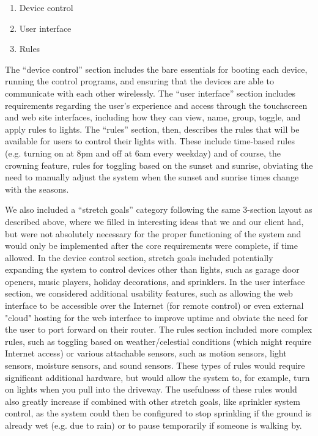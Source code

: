 \documentclass[letterpaper,10pt]{article}
\begin{document}
\begin{enumerate}
    \item Device control
    \item User interface
    \item Rules
\end{enumerate}

The ``device control'' section includes the bare essentials for booting each
device, running the control programs, and ensuring that the devices are able to
communicate with each other wirelessly.  The ``user interface'' section
includes requirements regarding the user's experience and access through the
touchscreen and web site interfaces, including how they can view, name, group,
toggle, and apply rules to lights.  The ``rules'' section, then, describes the
rules that will be available for users to control their lights with.  These
include time-based rules (e.g. turning on at 8pm and off at 6am every weekday)
and of course, the crowning feature, rules for toggling based on the sunset and
sunrise, obviating the need to manually adjust the system when the sunset and
sunrise times change with the seasons.

We also included a ``stretch goals'' category following the same 3-section
layout as described above, where we filled in interesting ideas that we and our
client had, but were not absolutely necessary for the proper functioning of the
system and would only be implemented after the core requirements were complete,
if time allowed.  In the device control section, stretch goals included
potentially expanding the system to control devices other than lights, such as
garage door openers, music players, holiday decorations, and sprinklers.  In
the user interface section, we considered additional usability features, such
as allowing the web interface to be accessible over the Internet (for remote
control) or even external "cloud" hosting for the web interface to improve
uptime and obviate the need for the user to port forward on their router.  The
rules section included more complex rules, such as toggling based on
weather/celestial conditions (which might require Internet access) or various
attachable sensors, such as motion sensors, light sensors, moisture sensors,
and sound sensors.  These types of rules would require significant additional
hardware, but would allow the system to, for example, turn on lights when you
pull into the driveway.  The usefulness of these rules would also greatly
increase if combined with other stretch goals, like sprinkler system control,
as the system could then be configured to stop sprinkling if the ground is
already wet (e.g. due to rain) or to pause temporarily if someone is walking
by.
\end{document}
